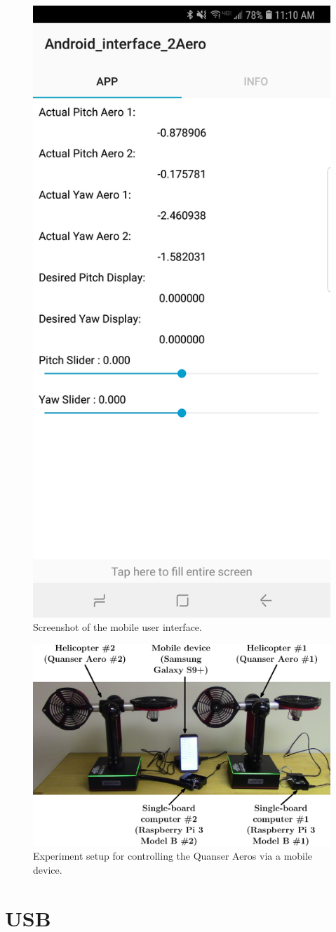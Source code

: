 \begin{figure}[!htbp]
    \centering
    \includegraphics[width=.46\textwidth,keepaspectratio=true]{figs/img/Screenshot_Android_Interface_2Aero}
    \caption{Screenshot of the mobile user interface.}
    \label{fig:Screenshot_Android_Interface}
\end{figure}

\begin{figure}[!htbp]
    \centering
    \includegraphics[width=.5\textwidth,keepaspectratio=true]{figs/ipe/Setup.eps}
    \caption{Experiment setup for controlling the Quanser Aeros via a mobile device.}
    \label{fig:Setup}
\end{figure}

\section{USB}
